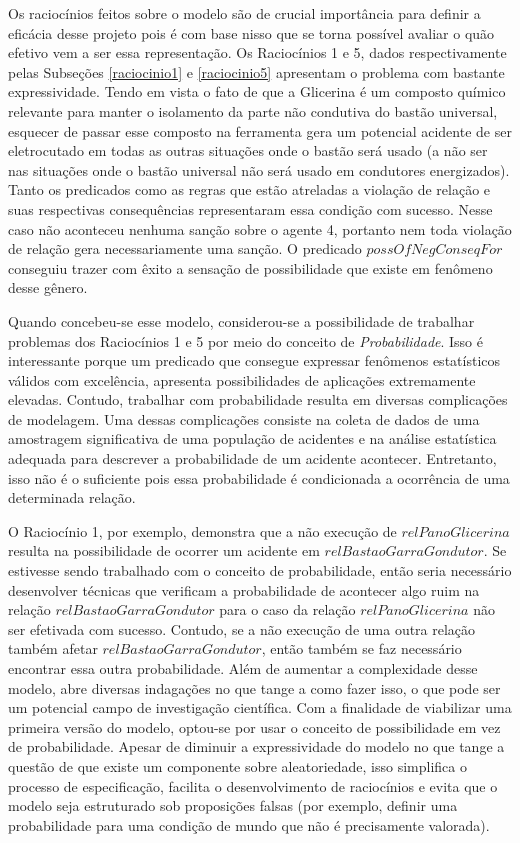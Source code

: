 Os raciocínios feitos sobre o modelo são de crucial importância para definir a eficácia desse projeto pois é com base nisso que se torna possível avaliar o quão efetivo vem a ser essa representação. Os Raciocínios 1 e 5, dados respectivamente pelas Subseções \ref{raciocinio1} e \ref{raciocinio5} apresentam o problema com bastante expressividade. Tendo em vista o fato de que a Glicerina  é um composto químico relevante para manter o isolamento da parte não condutiva do bastão universal, esquecer de passar esse composto na ferramenta gera um potencial acidente de ser eletrocutado em todas as outras situações onde o bastão será usado (a não ser nas situações onde o bastão universal não será usado em condutores energizados). Tanto os predicados como as regras que estão atreladas a violação de relação e suas respectivas consequências representaram essa condição com sucesso. Nesse caso não aconteceu nenhuma sanção sobre o agente 4, portanto nem toda violação de relação gera necessariamente uma sanção. O predicado $possOfNegConseqFor$ conseguiu trazer com êxito a sensação de possibilidade que existe em fenômeno desse gênero. 

Quando concebeu-se esse modelo, considerou-se a possibilidade de trabalhar problemas dos Raciocínios 1 e 5 por meio do conceito de \textit{Probabilidade}. Isso é interessante porque um predicado que consegue expressar fenômenos estatísticos válidos com excelência, apresenta possibilidades de aplicações extremamente elevadas. Contudo, trabalhar com probabilidade resulta em diversas complicações de modelagem. Uma dessas complicações consiste na coleta de dados de uma amostragem significativa de uma população de acidentes e na análise estatística adequada para descrever a probabilidade de um acidente acontecer. Entretanto, isso não é o suficiente pois essa probabilidade é condicionada a ocorrência de uma determinada relação. 

O Raciocínio 1, por exemplo, demonstra que a não execução de $relPanoGlicerina$ resulta na possibilidade de ocorrer um acidente em $relBastaoGarraGondutor$. Se estivesse sendo trabalhado com o conceito de probabilidade, então seria necessário desenvolver técnicas que verificam a probabilidade de acontecer algo ruim na relação $relBastaoGarraGondutor$ para o caso da relação $relPanoGlicerina$ não ser efetivada com sucesso. Contudo, se a não execução de uma outra relação também afetar $relBastaoGarraGondutor$, então também se faz necessário encontrar essa outra probabilidade. Além de aumentar a complexidade desse modelo, abre diversas indagações no que tange a como fazer isso, o que pode ser um potencial campo de investigação científica. Com a finalidade de viabilizar uma primeira versão do modelo, optou-se por usar o conceito de possibilidade em vez de probabilidade. Apesar de diminuir a expressividade do modelo no que tange a questão de que existe um componente sobre aleatoriedade, isso simplifica o processo de especificação, facilita o desenvolvimento de raciocínios e evita que o modelo seja estruturado sob proposições falsas (por exemplo, definir uma probabilidade para uma condição de mundo que não é precisamente valorada). 

